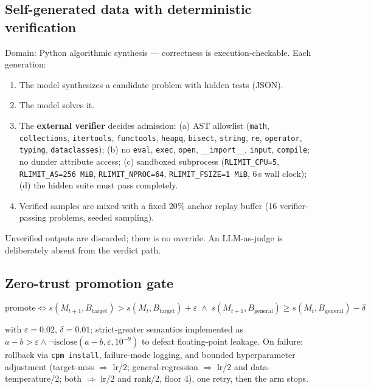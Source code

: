 \documentclass[11pt,a4paper]{article}
\begin{document}
\subsection{Self-generated data with deterministic verification}\label{sec:verify}

Domain: Python algorithmic synthesis --- correctness is execution-checkable.
Each generation:
\begin{enumerate}[leftmargin=1.6em]
  \item The model synthesizes a candidate problem with hidden tests (JSON).
  \item The model solves it.
  \item The \textbf{external verifier} decides admission: (a) AST allowlist
        (\texttt{math}, \texttt{collections}, \texttt{itertools},
        \texttt{functools}, \texttt{heapq}, \texttt{bisect}, \texttt{string},
        \texttt{re}, \texttt{operator}, \texttt{typing},
        \texttt{dataclasses}); (b) no \texttt{eval}, \texttt{exec},
        \texttt{open}, \texttt{\_\_import\_\_}, \texttt{input},
        \texttt{compile}; no dunder attribute access; (c) sandboxed
        subprocess (\texttt{RLIMIT\_CPU=5}, \texttt{RLIMIT\_AS=256\,MiB},
        \texttt{RLIMIT\_NPROC=64}, \texttt{RLIMIT\_FSIZE=1\,MiB}, 6\,s
        wall clock); (d) the hidden suite must pass completely.
  \item Verified samples are mixed with a fixed 20\% anchor replay buffer
        (16 verifier-passing problems, seeded sampling).
\end{enumerate}

Unverified outputs are discarded; there is no override. An LLM-as-judge is
deliberately absent from the verdict path.

\subsection{Zero-trust promotion gate}\label{sec:gate}

\begin{equation}
\mathrm{promote} \iff
s(M_{t+1}, B_{\mathrm{target}}) > s(M_t, B_{\mathrm{target}}) + \varepsilon
\;\land\;
s(M_{t+1}, B_{\mathrm{general}}) \ge s(M_t, B_{\mathrm{general}}) - \delta
\label{eq:gate}
\end{equation}

with $\varepsilon = 0.02$, $\delta = 0.01$; strict-greater semantics
implemented as $a - b > \varepsilon \land \lnot\mathrm{isclose}(a-b,
\varepsilon, 10^{-9})$ to defeat floating-point leakage. On failure:
rollback via \texttt{cpm install}, failure-mode logging, and bounded
hyperparameter adjustment (target-miss $\Rightarrow$ lr/2; general-regression
$\Rightarrow$ lr/2 and data-temperature/2; both $\Rightarrow$ lr/2 and
rank/2, floor 4), one retry, then the arm stops.
\end{document}
